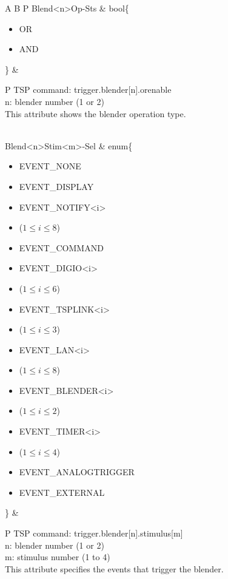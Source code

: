 \documentclass[openany]{article}
\begin{document}
\begin{longtable}{A B P}
		Blend{\textless n\textgreater}Op-Sts & bool\{\begin{itemize}[noitemsep]
					\small
					\item[] OR
					\item[] AND
				\end{itemize}\} & 
				\begin{tabular}{P}
					TSP command: trigger.blender[n].orenable \\
					n: blender number (1 or 2) \\
					This attribute shows the blender operation type.
				\end{tabular} \\ \hline
		Blend{\textless n\textgreater}Stim{\textless m\textgreater}-Sel & enum\{\begin{itemize}[noitemsep]
					\small
					\item[] EVENT\_NONE
					\item[] EVENT\_DISPLAY
					\item[] EVENT\_NOTIFY\textless i\textgreater
					\item[] ($1\leq i\leq 8$)
					\item[] EVENT\_COMMAND
					\item[] EVENT\_DIGIO\textless i\textgreater
					\item[] ($1\leq i\leq 6$)
					\item[] EVENT\_TSPLINK\textless i\textgreater
					\item[] ($1\leq i\leq 3$)
					\item[] EVENT\_LAN\textless i\textgreater
					\item[] ($1\leq i\leq 8$)
					\item[] EVENT\_BLENDER\textless i\textgreater 
					\item[] ($1\leq i\leq 2$)
					\item[] EVENT\_TIMER\textless i\textgreater
					\item[] ($1\leq i\leq 4$)
					\item[] EVENT\_ANALOGTRIGGER
					\item[] EVENT\_EXTERNAL
				\end{itemize}\} & 
				\begin{tabular}{P}
					TSP command: trigger.blender[n].stimulus[m] \\
					n: blender number (1 or 2) \\
					m: stimulus number (1 to 4) \\
					This attribute specifies the events that trigger the blender.
				\end{tabular} \\


\end{longtable}
\end{document}
